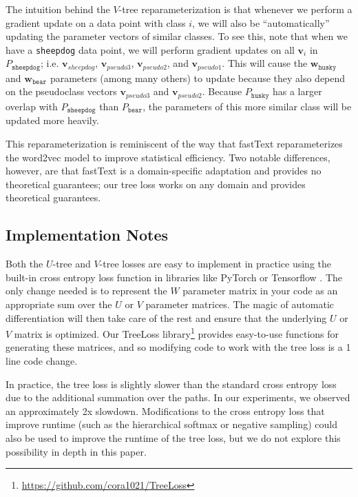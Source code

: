 \documentclass[twoside]{article}
\newcommand{\vv}{\mathbf v}
\newcommand{\w}{\mathbf w}
\begin{document}
The intuition behind the $V$-tree reparameterization is that whenever we perform a gradient update on a data point with class $i$,
we will also be ``automatically'' updating the parameter vectors of similar classes.
To see this, note that when we have a \texttt{sheepdog} data point,
we will perform gradient updates on all $\vv_i$ in $P_\texttt{sheepdog}$; i.e. $\vv_{sheepdog}$, $\vv_{\textit{pseudo3}}$, $\vv_{\textit{pseudo2}}$, and $\vv_{\textit{pseudo1}}$.
This will cause the $\w_{\texttt{husky}}$ and $\w_{\texttt{bear}}$ parameters (among many others) to update because they also depend on the pseudoclass vectors $\vv_{\textit{pseudo3}}$ and $\vv{_\textit{pseudo2}}$.
Because $P_\texttt{husky}$ has a larger overlap with $P_\texttt{sheepdog}$ than $P_\texttt{bear}$,
the parameters of this more similar class will be updated more heavily.

This reparameterization is reminiscent of the way that fastText \citep{bojanowski2017enriching} reparameterizes the word2vec \citep{Mikolov2013EfficientEO} model to improve statistical efficiency.
Two notable differences, however, are that fastText is a domain-specific adaptation and provides no theoretical guarantees;
our tree loss works on any domain and provides theoretical guarantees.

\subsection{Implementation Notes}

Both the $U$-tree and $V$-tree losses are easy to implement in practice using the built-in cross entropy loss function in libraries like PyTorch \citep{NEURIPS2019_9015} or Tensorflow \citep{tensorflow2015-whitepaper}.
The only change needed is to represent the $W$ parameter matrix in your code as an appropriate sum over the $U$ or $V$ parameter matrices.
The magic of automatic differentiation will then take care of the rest and ensure that the underlying $U$ or $V$ matrix is optimized.
Our TreeLoss library\footnote{\url{https://github.com/cora1021/TreeLoss}} provides easy-to-use functions for generating these matrices,
and so modifying code to work with the tree loss is a 1 line code change.

In practice, the tree loss is slightly slower than the standard cross entropy loss due to the additional summation over the paths.
In our experiments, we observed an approximately 2x slowdown.
Modifications to the cross entropy loss that improve runtime (such as the hierarchical softmax or negative sampling) could also be used to improve the runtime of the tree loss,
but we do not explore this possibility in depth in this paper.
\end{document}

